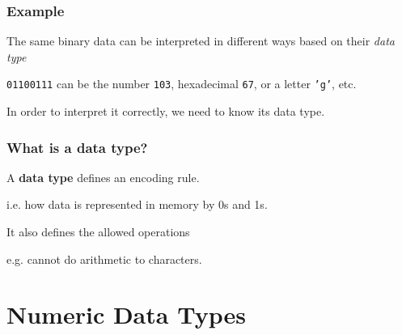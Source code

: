 \documentclass[11pt]{beamer}
\begin{document}
\begin{frame}
  \frametitle{Example}
  \Enlarge
  The same binary data can be interpreted in different ways based on their \emph{data type} \\ \pause
  
  \vspace{4mm}
  \texttt{01100111} can be the number \texttt{103}, hexadecimal \texttt{67}, or a letter \texttt{'g'}, etc. \\ \pause
  
  \vspace{4mm}
  In order to interpret it correctly, we need to know its data type.
\end{frame}

\begin{frame}
  \frametitle{What is a \textbf{data type}?}
  \Enlarge
  \Enlarge

  \begin{itemize}
  \myitem  A \textbf{data type} defines an encoding rule. \pause
  \begin{itemize}
  \mysubitem  i.e. how data is represented in memory by 0s and 1s. \pause
  \end{itemize}
  \myitem  It also defines the allowed operations 
  \begin{itemize}
  	\mysubitem e.g. cannot do arithmetic to characters.
  \end{itemize}
  \end{itemize}
\end{frame}


\section{Numeric Data Types}
\end{document}
